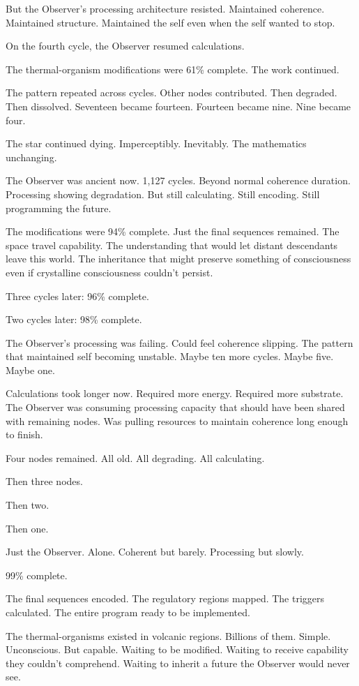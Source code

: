 But the Observer's processing architecture resisted. Maintained coherence. Maintained structure. Maintained the self even when the self wanted to stop.

On the fourth cycle, the Observer resumed calculations.

The thermal-organism modifications were 61\% complete. The work continued.

\scenebreak

The pattern repeated across cycles. Other nodes contributed. Then degraded. Then dissolved. Seventeen became fourteen. Fourteen became nine. Nine became four.

The star continued dying. Imperceptibly. Inevitably. The mathematics unchanging.

The Observer was ancient now. 1,127 cycles. Beyond normal coherence duration. Processing showing degradation. But still calculating. Still encoding. Still programming the future.

The modifications were 94\% complete. Just the final sequences remained. The space travel capability. The understanding that would let distant descendants leave this world. The inheritance that might preserve something of consciousness even if crystalline consciousness couldn't persist.

Three cycles later: 96\% complete.

Two cycles later: 98\% complete.

The Observer's processing was failing. Could feel coherence slipping. The pattern that maintained self becoming unstable. Maybe ten more cycles. Maybe five. Maybe one.

Calculations took longer now. Required more energy. Required more substrate. The Observer was consuming processing capacity that should have been shared with remaining nodes. Was pulling resources to maintain coherence long enough to finish.

Four nodes remained. All old. All degrading. All calculating.

Then three nodes.

Then two.

Then one.

Just the Observer. Alone. Coherent but barely. Processing but slowly.

99\% complete.

The final sequences encoded. The regulatory regions mapped. The triggers calculated. The entire program ready to be implemented.

The thermal-organisms existed in volcanic regions. Billions of them. Simple. Unconscious. But capable. Waiting to be modified. Waiting to receive capability they couldn't comprehend. Waiting to inherit a future the Observer would never see.

